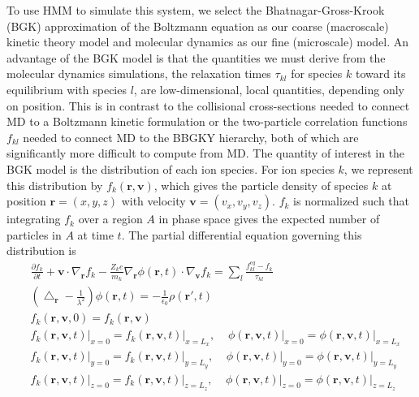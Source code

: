 \documentclass{article}
\begin{document}
To use HMM to simulate this system, we select the Bhatnagar-Gross-Krook (BGK) approximation of the Boltzmann equation as our coarse (macroscale) kinetic theory model and molecular dynamics as our fine (microscale) model. An advantage of the BGK model is that the quantities we must derive from the molecular dynamics simulations, the relaxation times $\tau_{kl}$ for species $k$ toward its equilibrium with species $l$, are low-dimensional, local quantities, depending only on position. This is in contrast to the collisional cross-sections needed to connect MD to a Boltzmann kinetic formulation or the two-particle correlation functions $f_{kl}$ needed to connect MD to the BBGKY hierarchy, both of which are significantly more difficult to compute from MD. The quantity of interest in the BGK model is the distribution of each ion species. For ion species $k$, we represent this distribution by $f_k(\mathbf{r},\mathbf{v})$, which gives the particle density of species $k$ at position $\mathbf{r}=(x,y,z)$ with velocity $\mathbf{v}=(v_x,v_y,v_z)$. $f_k$ is normalized such that integrating $f_k$ over a region $A$ in phase space gives the expected number of particles in $A$ at time $t$. The partial differential equation governing this distribution is
\begin{equation}
\begin{split}
&\frac{\partial f_k}{\partial t}+\mathbf{v}\cdot\nabla_\mathbf{r}f_k-\frac{Z_ke}{m_k}\nabla_\mathbf{r}\phi(\mathbf{r},t)\cdot\nabla_\mathbf{v}f_k=\sum_l\frac{f_{kl}^{eq}-f_k}{\tau_{kl}}\\
&\left(\bigtriangleup_\mathbf{r}-\frac{1}{\lambda^2}\right)\phi(\mathbf{r},t)=-\frac{1}{\epsilon_0}\rho(\mathbf{r}',t)\\
&f_k(\mathbf{r},\mathbf{v},0)=f_{k}(\mathbf{r},\mathbf{v})\\
&\left.f_k(\mathbf{r},\mathbf{v},t)\right|_{x=0}=\left.f_{k}(\mathbf{r},\mathbf{v},t)\right|_{x=L_x},\;\;\;\;
\left.\phi(\mathbf{r},\mathbf{v},t)\right|_{x=0}=\left.\phi(\mathbf{r},\mathbf{v},t)\right|_{x=L_x}\\
&\left.f_k(\mathbf{r},\mathbf{v},t)\right|_{y=0}=\left.f_{k}(\mathbf{r},\mathbf{v},t)\right|_{y=L_y},\;\;\;\;
\left.\phi(\mathbf{r},\mathbf{v},t)\right|_{y=0}=\left.\phi(\mathbf{r},\mathbf{v},t)\right|_{y=L_y}\\
&\left.f_k(\mathbf{r},\mathbf{v},t)\right|_{z=0}=\left.f_{k}(\mathbf{r},\mathbf{v},t)\right|_{z=L_z},\;\;\;\;
\left.\phi(\mathbf{r},\mathbf{v},t)\right|_{z=0}=\left.\phi(\mathbf{r},\mathbf{v},t)\right|_{z=L_z}
\end{split}
\label{eq:BGK}
\end{equation}
\end{document}
